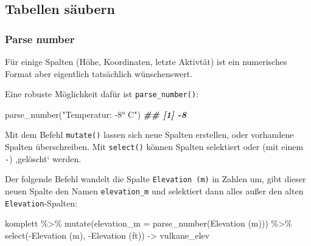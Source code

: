 \documentclass[
  ngerman,
]{article}
\newenvironment{Shaded}{\begin{snugshade}}{\end{snugshade}}
\newcommand{\AttributeTok}[1]{\textcolor[rgb]{0.77,0.63,0.00}{#1}}
\newcommand{\DocumentationTok}[1]{\textcolor[rgb]{0.56,0.35,0.01}{\textbf{\textit{#1}}}}
\newcommand{\FunctionTok}[1]{\textcolor[rgb]{0.00,0.00,0.00}{#1}}
\newcommand{\NormalTok}[1]{#1}
\newcommand{\OtherTok}[1]{\textcolor[rgb]{0.56,0.35,0.01}{#1}}
\newcommand{\SpecialCharTok}[1]{\textcolor[rgb]{0.00,0.00,0.00}{#1}}
\newcommand{\StringTok}[1]{\textcolor[rgb]{0.31,0.60,0.02}{#1}}
\begin{document}
\hypertarget{tabellen-suxe4ubern}{%
\subsection{Tabellen säubern}\label{tabellen-suxe4ubern}}

\hypertarget{parse-number}{%
\subsubsection{Parse number}\label{parse-number}}

Für einige Spalten (Höhe, Koordinaten, letzte Aktivtät) ist ein numerisches Format aber eigentlich tatsächlich wünschenswert.

Eine robuste Möglichkeit dafür ist \texttt{parse\_number()}:

\begin{Shaded}
\begin{Highlighting}[]
\FunctionTok{parse\_number}\NormalTok{(}\StringTok{"Temperatur: {-}8° C"}\NormalTok{)}
\DocumentationTok{\#\# [1] {-}8}
\end{Highlighting}
\end{Shaded}

Mit dem Befehl \texttt{mutate()} lassen sich neue Spalten erstellen, oder vorhandene Spalten überschreiben. Mit \texttt{select()} können Spalten selektiert oder (mit einem \texttt{-}) ,gelöscht` werden.

Der folgende Befehl wandelt die Spalte \texttt{Elevation\ (m)} in Zahlen um, gibt dieser neuen Spalte den Namen \texttt{elevation\_m} und selektiert dann alles außer den alten \texttt{Elevation}-Spalten:

\begin{Shaded}
\begin{Highlighting}[]
\NormalTok{komplett }\SpecialCharTok{\%\textgreater{}\%}
  \FunctionTok{mutate}\NormalTok{(}\AttributeTok{elevation\_m =} \FunctionTok{parse\_number}\NormalTok{(}\StringTok{\textasciigrave{}}\AttributeTok{Elevation (m)}\StringTok{\textasciigrave{}}\NormalTok{)) }\SpecialCharTok{\%\textgreater{}\%}
  \FunctionTok{select}\NormalTok{(}\SpecialCharTok{{-}}\StringTok{\textasciigrave{}}\AttributeTok{Elevation (m)}\StringTok{\textasciigrave{}}\NormalTok{, }\SpecialCharTok{{-}}\StringTok{\textasciigrave{}}\AttributeTok{Elevation (ft)}\StringTok{\textasciigrave{}}\NormalTok{)  }\OtherTok{{-}\textgreater{}}\NormalTok{ vulkane\_elev}
\end{Highlighting}
\end{Shaded}
\end{document}
